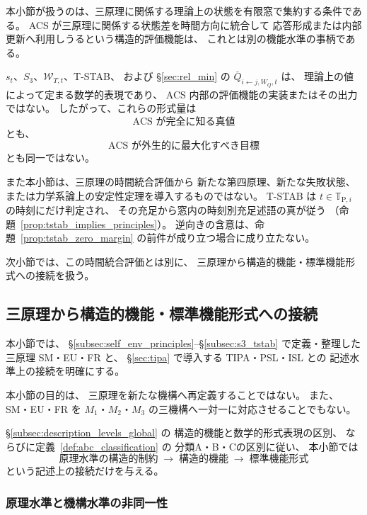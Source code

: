 \begin{remark}[時間集約条件の記述上の地位]
\label{rem:tstab_descriptive_status}
本小節が扱うのは、三原理に関係する理論上の状態を有限窓で集約する条件である。
ACS が三原理に関係する状態差を時間方向に統合して
応答形成または内部更新へ利用しうるという構造的評価機能は、
これとは別の機能水準の事柄である。

$s_t$、$S_3$、$\mathcal{W}_{T,t}$、T-STAB、
および \S\ref{sec:rel_min} の $\bar Q_{i\leftarrow j,W_Q,t}$ は、
理論上の値によって定まる数学的表現であり、
ACS 内部の評価機能の実装またはその出力ではない。
したがって、これらの形式量は
\[
  \text{ACS が完全に知る真値}
\]
とも、
\[
  \text{ACS が外生的に最大化すべき目標}
\]
とも同一ではない。

また本小節は、三原理の時間統合評価から
新たな第四原理、新たな失敗状態、
または力学系論上の安定性定理を導入するものではない。
T-STAB は $t\in\mathbb{T}_{\mathrm{P},i}$ の時刻にだけ判定され、
その充足から窓内の時刻別充足述語の真が従う
（命題~\ref{prop:tstab_implies_principles}）。
逆向きの含意は、命題~\ref{prop:tstab_zero_margin} の前件が成り立つ場合に成り立たない。

次小節では、この時間統合評価とは別に、
三原理から構造的機能・標準機能形式への接続を扱う。
\end{remark}

\subsection{三原理から構造的機能・標準機能形式への接続}
\label{subsec:principles_to_tipa}

本小節では、
\S\ref{subsec:self_env_principles}--\S\ref{subsec:s3_tstab}
で定義・整理した三原理 SM・EU・FR と、
\S\ref{sec:tipa} で導入する TIPA・PSL・ISL との
記述水準上の接続を明確にする。

本小節の目的は、
三原理を新たな機構へ再定義することではない。
また、SM・EU・FR を
$M_1$・$M_2$・$M_3$ の三機構へ一対一に対応させることでもない。

\S\ref{subsec:description_levels_global} の
構造的機能と数学的形式表現の区別、
ならびに定義~\ref{def:abc_classification} の
分類A・B・Cの区別に従い、
本小節では
\[
  \text{原理水準の構造的制約}
  \;\longrightarrow\;
  \text{構造的機能}
  \;\longrightarrow\;
  \text{標準機能形式}
\]
という記述上の接続だけを与える。

\subsubsection{原理水準と機構水準の非同一性}

